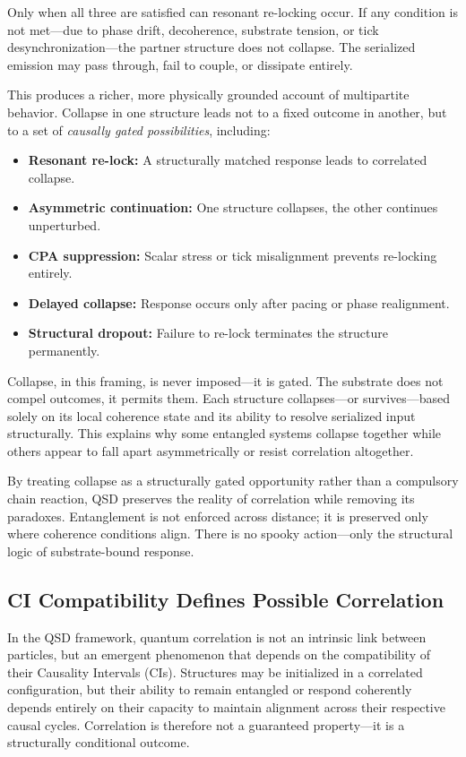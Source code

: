 \documentclass[preprints,article,submit,pdftex,moreauthors]{Definitions/mdpi}
\begin{document}
Only when all three are satisfied can resonant re-locking occur. If any condition is not met—due to phase drift, decoherence, substrate tension, or tick desynchronization—the partner structure does not collapse. The serialized emission may pass through, fail to couple, or dissipate entirely.

This produces a richer, more physically grounded account of multipartite behavior. Collapse in one structure leads not to a fixed outcome in another, but to a set of \emph{causally gated possibilities}, including:
\begin{itemize}
    \item \textbf{Resonant re-lock:} A structurally matched response leads to correlated collapse.
    \item \textbf{Asymmetric continuation:} One structure collapses, the other continues unperturbed.
    \item \textbf{CPA suppression:} Scalar stress or tick misalignment prevents re-locking entirely.
    \item \textbf{Delayed collapse:} Response occurs only after pacing or phase realignment.
    \item \textbf{Structural dropout:} Failure to re-lock terminates the structure permanently.
\end{itemize}

Collapse, in this framing, is never imposed—it is gated. The substrate does not compel outcomes, it permits them. Each structure collapses—or survives—based solely on its local coherence state and its ability to resolve serialized input structurally. This explains why some entangled systems collapse together while others appear to fall apart asymmetrically or resist correlation altogether.

By treating collapse as a structurally gated opportunity rather than a compulsory chain reaction, QSD preserves the reality of correlation while removing its paradoxes. Entanglement is not enforced across distance; it is preserved only where coherence conditions align. There is no spooky action—only the structural logic of substrate-bound response.


\subsection{CI Compatibility Defines Possible Correlation}

In the QSD framework, quantum correlation is not an intrinsic link between particles, but an emergent phenomenon that depends on the compatibility of their Causality Intervals (CIs). Structures may be initialized in a correlated configuration, but their ability to remain entangled or respond coherently depends entirely on their capacity to maintain alignment across their respective causal cycles. Correlation is therefore not a guaranteed property—it is a structurally conditional outcome.
\end{document}
